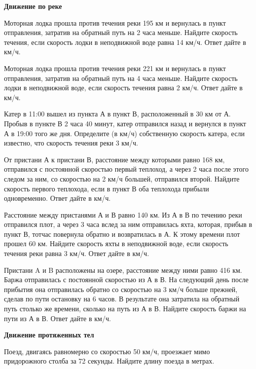 \newpage

\centerline{\bf \Huge Движение по реке}


 Моторная лодка прошла против течения реки 195 км и вернулась в пункт отправления, затратив на обратный путь на 2 часа меньше. Найдите скорость течения, если скорость лодки в неподвижной воде равна 14 км/ч. Ответ дайте в км/ч.

 Моторная лодка прошла против течения реки 221 км и вернулась в пункт отправления, затратив на обратный путь на 4 часа меньше. Найдите скорость лодки в неподвижной воде, если скорость течения равна 2 км/ч. Ответ дайте в км/ч.

 Катер в 11:00 вышел из пункта А в пункт В, расположенный в 30 км от А. Пробыв в пункте В 2 часа 40 минут, катер отправился назад и вернулся в пункт А в 19:00 того же дня. Определите (в км/ч) собственную скорость катера, если известно, что скорость течения реки 3 км/ч.

 От пристани А к пристани В, расстояние между которыми равно 168 км, отправился с постоянной скоростью первый теплоход, а через 2 часа после этого следом за ним, со скоростью на 2 км/ч большей, отправился второй. Найдите скорость первого теплохода, если в пункт В оба теплохода прибыли одновременно. Ответ дайте в км/ч.

 Расстояние между пристанями А и В равно 140 км. Из А в В по течению реки отправился плот, а через 3 часа вслед за ним отправилась яхта, которая, прибыв в пункт В, тотчас повернула обратно и возвратилась в А. К этому времени плот прошел 60 км. Найдите скорость яхты в неподвижной воде, если скорость течения реки равна 3 км/ч. Ответ дайте в км/ч.

 Пристани A и B расположены на озере, расстояние между ними равно 416 км. Баржа отправилась с постоянной скоростью из А в В. На следующий день после прибытия она отправилась обратно со скоростью на 3 км/ч больше прежней, сделав по пути остановку на 6 часов. В результате она затратила на обратный путь столько же времени, сколько на путь из А в В. Найдите скорость баржи на пути из А в В. Ответ дайте в км/ч.


\centerline{\bf \Huge Движение протяженных тел}


 Поезд, двигаясь равномерно со скоростью 50 км/ч, проезжает мимо придорожного столба за 72 секунды. Найдите длину поезда в метрах.

